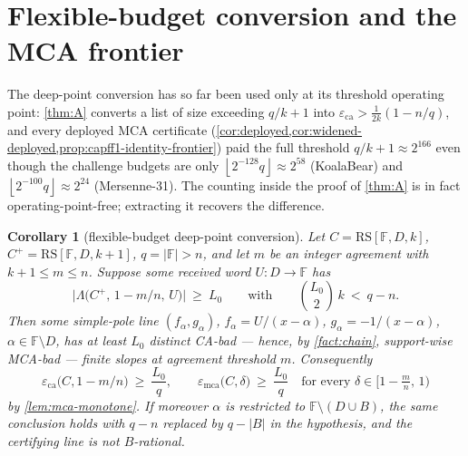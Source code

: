 \documentclass[11pt]{article}
\newtheorem{corollary}[corollary]{Corollary}
\theoremstyle{definition}
\theoremstyle{remark}
\newcommand{\F}{\mathbb{F}}
\newcommand{\B}{B}
\newcommand{\RS}{\mathrm{RS}}
\newcommand{\eca}{\varepsilon_{\mathrm{ca}}}
\newcommand{\emca}{\varepsilon_{\mathrm{mca}}}
\newcommand{\Lst}{\Lambda}
\newcommand{\Hb}{\mathrm{H}_2}
\begin{document}
\providecommand{\F}{\mathbb F}
\providecommand{\B}{\mathbb B}
\providecommand{\RS}{\mathrm{RS}}
\providecommand{\Hb}{H_{\mathrm b}}
\providecommand{\Lst}{\mathrm{Lst}}
\providecommand{\Cen}{\operatorname{cen}}
\providecommand{\Rone}{\mathrm{R1}}
\providecommand{\wdeg}{\operatorname{wdeg}}
\providecommand{\emca}{\varepsilon_{\mathrm{mca}}}
\providecommand{\eca}{\varepsilon_{\mathrm{ca}}}
\providecommand{\ceil}[1]{\left\lceil #1\right\rceil}
\providecommand{\floor}[1]{\left\lfloor #1\right\rfloor}

\section{Flexible-budget conversion and the MCA frontier}
\label{sec:capg-frontier}

The deep-point conversion has so far been used only at its threshold
operating point: \cref{thm:A} converts a list of size exceeding $q/k+1$
into $\eca>\tfrac1{2k}(1-n/q)$, and every deployed MCA certificate
(\cref{cor:deployed,cor:widened-deployed,prop:capff1-identity-frontier})
paid the full threshold $q/k+1\approx2^{166}$ even though the challenge
budgets are only $\floor{2^{-128}q}\approx2^{58}$ (KoalaBear) and
$\floor{2^{-100}q}\approx2^{24}$ (Mersenne-31).  The counting inside the
proof of \cref{thm:A} is in fact operating-point-free; extracting it
recovers the difference.

\begin{corollary}[flexible-budget deep-point conversion]
\label{cor:capg-budget-conversion}
Let $C=\RS[\F,D,k]$, $C^{+}=\RS[\F,D,k+1]$, $q=|\F|>n$, and let $m$ be an
integer agreement with $k+1\le m\le n$.  Suppose some received word
$U:D\to\F$ has
\[
        \bigl|\Lst\bigl(C^{+},\,1-m/n,\,U\bigr)\bigr|\ \ge\ L_0
        \qquad\text{with}\qquad
        \binom{L_0}{2}\,k\ <\ q-n .
\]
Then some simple-pole line $(f_\alpha,g_\alpha)$,
$f_\alpha=U/(x-\alpha)$, $g_\alpha=-1/(x-\alpha)$, $\alpha\in\F\setminus
D$, has at least $L_0$ distinct CA-bad --- hence, by \cref{fact:chain},
support-wise MCA-bad --- finite slopes at agreement threshold $m$.
Consequently
\[
        \eca\bigl(C,1-m/n\bigr)\ \ge\ \frac{L_0}{q},
        \qquad
        \emca\bigl(C,\delta\bigr)\ \ge\ \frac{L_0}{q}
        \quad\text{for every }\delta\in\bigl[1-\tfrac mn,\,1\bigr)
\]
by \cref{lem:mca-monotone}.  If moreover $\alpha$ is restricted to
$\F\setminus(D\cup\B)$, the same conclusion holds with $q-n$ replaced by
$q-|\B|$ in the hypothesis, and the certifying line is not $\B$-rational.
\end{corollary}
\end{document}
